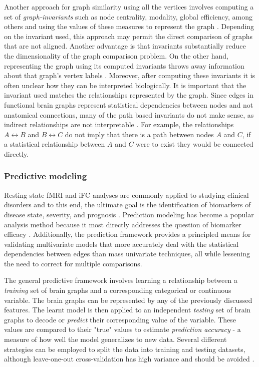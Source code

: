 \documentclass{bmcart}
\begin{document}
Another approach for graph similarity using all the vertices involves computing a set of \emph{graph-invariants} such as node centrality, modality, global efficiency, among others and using the values of these measures to represent the graph \cite{Rubinov2010,Bullmore2011}. Depending on the invariant used, this approach may permit the direct comparison of graphs that are not aligned. Another advantage is that invariants substantially reduce the dimensionality of the graph comparison problem. On the other hand, representing the graph using its computed invariants throws away information about that graph's vertex labels \cite{Vogelstein2013}. Moreover, after computing these invariants it is often unclear how they can be interpreted biologically. It is important that the invariant used matches the relationships represented by the graph. Since edges in functional brain graphs represent statistical dependencies between nodes and not anatomical connections, many of the path based invariants do not make sense, as indirect relationships are not interpretable \cite{Rubinov2010}. For example, the relationships $A \leftrightarrow B$ and $B \leftrightarrow C$ do not imply that there is a path between nodes $A$ and $C$, if a statistical relationship between $A$ and $C$ were to exist they would be connected directly.   

\subsubsection{Predictive modeling}

Resting state fMRI and iFC analyses are commonly applied to studying clinical disorders and to this end, the ultimate goal is the identification of biomarkers of disease state, severity, and prognosis \cite{Castellanos2013}. Prediction modeling has become a popular analysis method because it most directly addresses the question of biomarker efficacy \cite{Craddock2009, Dosenbach2010, Richiardi2013}. Additionally, the prediction framework provides a principled means for validating multivariate models that more accurately deal with the statistical dependencies between edges than mass univariate techniques, all while lessening the need to correct for multiple comparisons. 

The general predictive framework involves learning a relationship between a \emph{training} set of brain graphs and a corresponding categorical or continuous variable. The brain graphs can be represented by any of the previously discussed features. The learnt model is then applied to an independent \emph{testing} set of brain graphs to decode or \emph{predict} their corresponding value of the variable. These values are compared to their "true" values to estimate \emph{prediction accuracy} - a measure of how well the model generalizes to new data. Several different strategies can be employed to split the data into training and testing datasets, although leave-one-out cross-validation has high variance and should be avoided \cite{james2014introduction}. 
\end{document}
